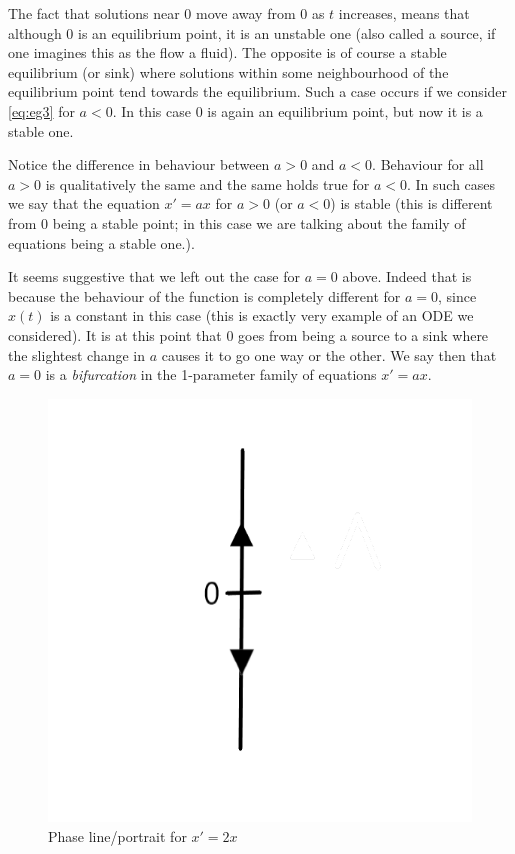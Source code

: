 The fact that solutions near 0 move away from 0 as $t$ increases, means that although 0 is an equilibrium point, it is an unstable one (also called a source, if one imagines this as the flow a fluid). The opposite is of course a stable equilibrium (or sink) where solutions within some neighbourhood of the equilibrium point tend towards the equilibrium. Such a case occurs if we consider \autoref{eq:eg3} for $a < 0$. In this case 0 is again an equilibrium point, but now it is a stable one.

Notice the difference in behaviour between $a > 0$ and $a < 0$. Behaviour for all $a > 0$ is qualitatively the same and the same holds true for $a < 0$. In such cases we say that the equation $x' = ax$ for $a > 0$ (or $a < 0$) is stable (this is different from 0 being a stable point; in this case we are talking about the family of equations being a stable one.). 

It seems suggestive that we left out the case for $a = 0$ above. Indeed that is because the behaviour of the function is completely different for $a = 0$, since $x(t)$ is a constant in this case (this is exactly very example of an ODE we considered). It is at this point that 0 goes from being a source to a sink where the slightest change in $a$ causes it to go one way or the other. We say then that $a = 0$ is a \textit{bifurcation} in the 1-parameter family of equations $x' = ax$.

\begin{figure}[h]
    \centering
    \includegraphics[scale=0.25]{Images/phase_line.png}
    \caption{Phase line/portrait for $x' = 2x$}
    \label{fig:phase_line}
\end{figure}

